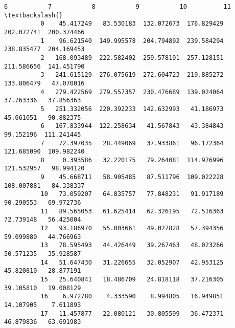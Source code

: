 \documentclass[11pt]{article}
\begin{document}
\begin{Verbatim}[commandchars=\\\{\}]
                      6           7           8           9           10          11  \textbackslash{}
          0    45.417249   83.530183  132.072673  176.829429  202.072741  200.374466   
          1    96.621540  149.995578  204.794892  239.584294  238.835477  204.169453   
          2   168.093489  222.582402  259.578191  257.128151  211.586656  141.451790   
          3   241.615129  276.075619  272.604723  219.885272  133.806479   47.070016   
          4   279.422569  279.557357  230.476689  139.024064   37.763336   37.856363   
          5   251.332056  220.392233  142.632993   41.186973   45.661051   90.882375   
          6   167.833944  122.258634   41.567843   43.384843   99.152196  111.241445   
          7    72.397035   28.449069   37.933861   96.172364  121.685090  109.982240   
          8     0.393586   32.220175   79.264081  114.976996  121.532957   98.994120   
          9    45.668711   58.905485   87.511796  109.022228  108.007881   84.338337   
          10   73.059207   64.835757   77.848231   91.917189   90.290553   69.972736   
          11   89.565053   61.625414   62.326195   72.516363   72.739148   56.425004   
          12   93.186970   55.003661   49.027828   57.394356   59.099880   44.766963   
          13   78.595493   44.426449   39.267463   48.023266   50.571235   35.928587   
          14   51.647430   31.226655   32.052907   42.953125   45.820810   28.877191   
          15   25.640841   18.486709   24.818118   37.216305   39.105810   19.008129   
          16    6.972780    4.333590    8.994805   16.949851   14.107905    7.611893   
          17   11.457877   22.080121   30.805599   36.472371   46.879836   63.691983   
          

\end{Verbatim}
\end{document}
